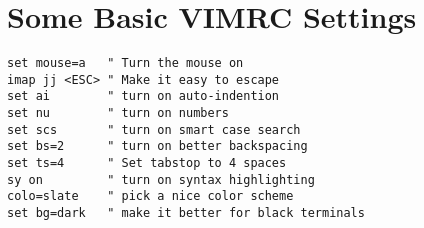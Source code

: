 \section{Some Basic VIMRC Settings}
\begin{lstlisting}[language={}, label=vimrc,caption=vimrc]
set mouse=a   " Turn the mouse on
imap jj <ESC> " Make it easy to escape
set ai        " turn on auto-indention
set nu        " turn on numbers
set scs       " turn on smart case search
set bs=2      " turn on better backspacing
set ts=4      " Set tabstop to 4 spaces
sy on         " turn on syntax highlighting
colo=slate    " pick a nice color scheme
set bg=dark   " make it better for black terminals
\end{lstlisting}
